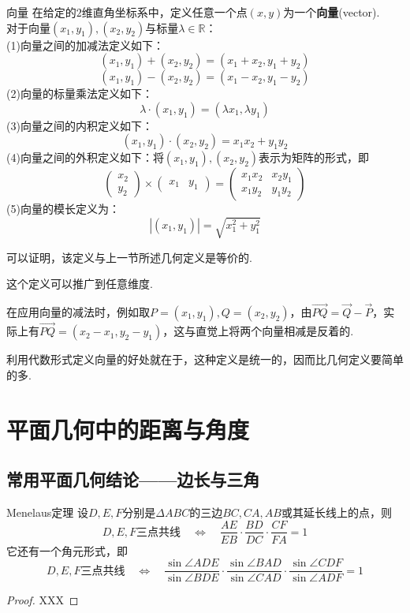 \documentclass[lang=cn, zihao=5]{elegantbook}
\newcommand{\xl}[1]{\overrightarrow{#1}}
\newcommand{\R}{\mathbb{R}}
\begin{document}
\begin{definition}{向量}
	在给定的$2$维直角坐标系中，定义任意一个点$(x,y)$为一个\textbf{向量}(vector). \\
	对于向量$(x_1,y_1),(x_2,y_2)$与标量$\lambda \in \R$： \\
	(1)向量之间的加减法定义如下：
	$$(x_1,y_1) + (x_2,y_2) = (x_1+x_2,y_1+y_2)$$
	$$(x_1,y_1) - (x_2,y_2) = (x_1-x_2,y_1-y_2)$$
	(2)向量的标量乘法定义如下：$$\lambda \cdot (x_1,y_1) = (\lambda x_1, \lambda y_1)$$
	(3)向量之间的内积定义如下：$$(x_1,y_1) \cdot (x_2,y_2) = x_1x_2 + y_1y_2$$
	(4)向量之间的外积定义如下：将$(x_1,y_1),(x_2,y_2)$表示为矩阵的形式，即$$\begin{pmatrix}
		x_2 \\ y_2 \end{pmatrix} \times \begin{pmatrix}
			x_1 & y_1 \end{pmatrix} = \begin{pmatrix}
				x_1x_2 & x_2y_1 \\ x_1y_2 & y_1y_2
			\end{pmatrix}$$
	(5)向量的模长定义为：$$|(x_1,y_1)|=\sqrt{x_1^2+y_1^2}$$
\end{definition}
\begin{remark}
	可以证明，该定义与上一节所述几何定义是等价的.
\end{remark}
\begin{remark}
	这个定义可以推广到任意维度.
\end{remark}
\begin{note}
	在应用向量的减法时，例如取$P=(x_1,y_1),Q=(x_2,y_2)$，由$\xl{PQ}=\xl{Q}-\xl{P}$，实际上有$\xl{PQ}=(x_2-x_1,y_2-y_1)$，这与直觉上将两个向量相减是反着的.
\end{note}

利用代数形式定义向量的好处就在于，这种定义是统一的，因而比几何定义要简单的多.



\chapter{平面几何中的距离与角度}

\section{常用平面几何结论——边长与三角}

\begin{theorem}{Menelaus定理}
    设$D,E,F$分别是$\Delta ABC$的三边$BC,CA,AB$或其延长线上的点，则$$D,E,F \text{三点共线} \quad \Longleftrightarrow \quad \frac{AE}{EB} \cdot \frac{BD}{DC} \cdot \frac{CF}{FA} = 1$$
    它还有一个角元形式，即$$D,E,F \text{三点共线} \quad \Longleftrightarrow \quad \frac{\sin \angle ADE}{\sin \angle BDE} \cdot \frac{\sin \angle BAD}{\sin \angle CAD} \cdot \frac{\sin \angle CDF}{\sin \angle ADF} = 1$$
\end{theorem}
\begin{proof}
    XXX
\end{proof}
\end{document}
